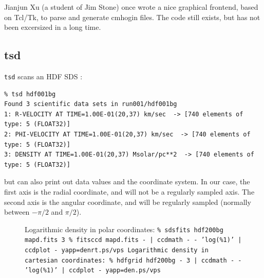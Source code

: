\documentclass[10pt,dvips]{article}
\begin{document}
{Jianjun Xu (a student of Jim Stone) once wrote a nice graphical frontend,
based on Tcl/Tk, to parse and generate cmhogin files. The code still
exists, but has not been excersized in a long time.

\subsection{tsd}

{\tt tsd} scans an HDF SDS :
\footnotesize\begin{verbatim}
% tsd hdf001bg 
Found 3 scientific data sets in run001/hdf001bg
1: R-VELOCITY AT TIME=1.00E-01(20,37) km/sec  -> [740 elements of type: 5 (FLOAT32)]
2: PHI-VELOCITY AT TIME=1.00E-01(20,37) km/sec  -> [740 elements of type: 5 (FLOAT32)]
3: DENSITY AT TIME=1.00E-01(20,37) Msolar/pc**2  -> [740 elements of type: 5 (FLOAT32)]
\end{verbatim}\normalsize

but can also print out data values and the coordinate system. In our case, the
first axis is the radial coordinate, and will not be a regularly sampled axis. The
second axis is the angular coordinate, and will be regularly sampled
(normally between $-\pi/2$ and $\pi/2$).


\begin{figure}[htbp]
\centering
{}
\hspace{0in}
\caption{
Logarithmic density in polar coordinates:\newline
  \tt \% sdsfits hdf200bg mapd.fits 3\newline
  \tt \% fitsccd mapd.fits - | ccdmath - - 'log(\%1)' | ccdplot - yapp=denrt.ps/vps\newline
Logarithmic density in cartesian coordinates:\newline
  \tt \% hdfgrid hdf200bg - 3 | ccdmath - - 'log(\%1)' | ccdplot - yapp=den.ps/vps\newline
}
\end{figure}

}
\end{document}
